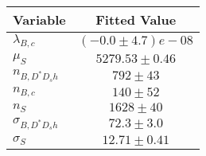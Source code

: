 \begin{tabular}[t]{lc}
\hline
Variable &Fitted Value\\
\hline\hline
$\lambda_{B,c}$&$(-0.0\pm4.7)e-08$\\
\hline
$\mu_S$&$5279.53\pm0.46$\\
\hline
$n_{B, D^* D_s h}$&$792\pm43$\\
\hline
$n_{B,c}$&$140\pm52$\\
\hline
$n_S$&$1628\pm40$\\
\hline
$\sigma_{B, D^* D_s h}$&$72.3\pm3.0$\\
\hline
$\sigma_S$&$12.71\pm0.41$\\
\hline
\end{tabular}